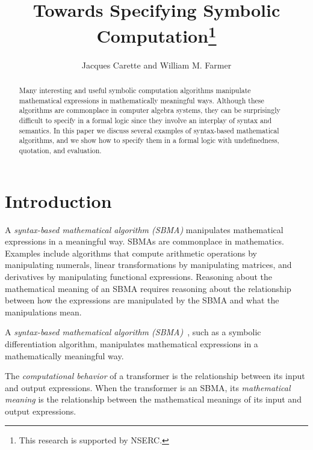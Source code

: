 \documentclass[fleqn]{llncs}
\title{Towards Specifying Symbolic Computation\thanks{This research is
    supported by NSERC.}}
\author{Jacques Carette and William M. Farmer}
\institute{%
Computing and Software, McMaster University, Canada\\
\url{http://www.cas.mcmaster.ca/~carette}\\
\url{http://imps.mcmaster.ca/wmfarmer}\\[1.5ex]
}
\begin{document}
\maketitle

\begin{abstract}

Many interesting and useful symbolic computation algorithms manipulate
mathematical expressions in mathematically meaningful ways.  Although
these algorithms are commonplace in computer algebra systems, they can
be surprisingly difficult to specify in a formal logic since they
involve an interplay of syntax and semantics.  In this paper we
discuss several examples of syntax-based mathematical algorithms, and
we show how to specify them in a formal logic with undefinedness,
quotation, and evaluation.

\end{abstract}

\iffalse

\textbf{Keywords:} Symbolic computation, computer algebra systems,
reasoning about syntax, undefinedness, quotation and evaluation.

\fi

\section{Introduction}

\iffalse

A \emph{syntax-based mathematical algorithm (SBMA)} manipulates
mathematical expressions in a meaningful way.  SBMAs
are commonplace in mathematics.  Examples include algorithms that
compute arithmetic operations by manipulating numerals, linear
transformations by manipulating matrices, and derivatives by
manipulating functional expressions.  Reasoning about the mathematical
meaning of an SBMA requires reasoning about the relationship between
how the expressions are manipulated by the SBMA and what the
manipulations mean.

A \emph{syntax-based mathematical algorithm (SBMA)}~\cite{Farmer13},
such as a symbolic differentiation algorithm, manipulates mathematical
expressions in a mathematically meaningful way.

The \emph{computational
  behavior} of a transformer is the relationship between its input and
output expressions.  When the transformer is an SBMA, its
\emph{mathematical meaning} is the relationship between the
mathematical meanings of its input and output expressions.
\end{document}
